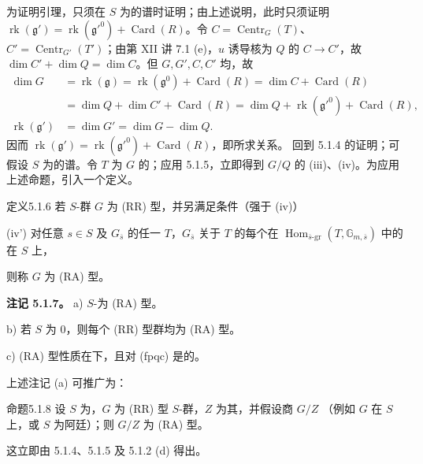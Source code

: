 为证明引理，只须在 $S$ 为的谱时证明；由上述说明，此时只须证明 $\operatorname{rk}(\mathfrak g')=\operatorname{rk}(\mathfrak g'^0)+\operatorname{Card}(R)$。令 $C=\operatorname{Centr}_G(T)$、$C'=\operatorname{Centr}_{G'}(T')$；由第 XII 讲 7.1 (e)，$u$ 诱导核为 $Q$ 的 $C\to C'$，故 $\dim C'+\dim Q=\dim C$。但 $G,G',C,C'$ 均，故
\[\begin{aligned}
\dim G&=\operatorname{rk}(\mathfrak g)=\operatorname{rk}(\mathfrak g^0)+\operatorname{Card}(R)=\dim C+\operatorname{Card}(R)\\
&=\dim Q+\dim C'+\operatorname{Card}(R)=\dim Q+\operatorname{rk}(\mathfrak g'^0)+\operatorname{Card}(R),\\
\operatorname{rk}(\mathfrak g')&=\dim G'=\dim G-\dim Q.
\end{aligned}\]
因而 $\operatorname{rk}(\mathfrak g')=\operatorname{rk}(\mathfrak g'^0)+\operatorname{Card}(R)$，即所求关系。
回到 5.1.4 的证明；可假设 $S$ 为的谱。令 $T$ 为 $G$ 的；应用 5.1.5，立即得到 $G/Q$ 的 (iii)、(iv)。为应用上述命题，引入一个定义。
\begin{SGAresult}{定义}{5.1.6} 若 $S$-群 $G$ 为 (RR) 型，并另满足条件（强于 (iv)）

(iv') 对任意 $s\in S$ 及 $G_{\overline s}$ 的任一 $T$，$G_{\overline s}$ 关于 $T$ 的每个在 $\operatorname{Hom}_{\overline s\text{-gr}}(T,\mathbb G_{m,\overline s})$ 中的在 $S$ 上，

则称 $G$ 为 (RA) 型。
\end{SGAresult}
\textbf{注记 5.1.7。} a)  $S$-为 (RA) 型。

b) 若 $S$ 为 $0$，则每个 (RR) 型群均为 (RA) 型。

c) (RA) 型性质在下，且对 (fpqc) 是的。

上述注记 (a) 可推广为：
\begin{SGAresult}{命题}{5.1.8} 设 $S$ 为，$G$ 为 (RR) 型 $S$-群，$Z$ 为其，并假设商 $G/Z$ （例如 $G$ 在 $S$ 上，或 $S$ 为阿廷）；则 $G/Z$ 为 (RA) 型。\end{SGAresult}
这立即由 5.1.4、5.1.5 及 5.1.2 (d) 得出。

